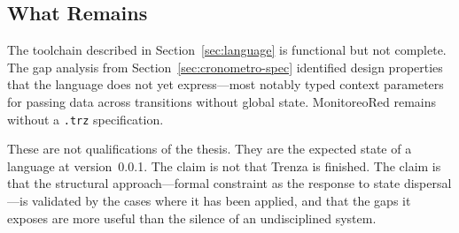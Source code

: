 \subsection{What Remains}
\label{sec:remains}

The toolchain described in Section~\ref{sec:language} is functional but not
complete. The gap analysis from Section~\ref{sec:cronometro-spec} identified
design properties that the language does not yet express---most notably typed
context parameters for passing data across transitions without global state.
MonitoreoRed remains without a \texttt{.trz} specification.

These are not qualifications of the thesis. They are the expected state of a
language at version~0.0.1. The claim is not that Trenza is finished. The claim
is that the structural approach---formal constraint as the response to state
dispersal---is validated by the cases where it has been applied, and that the
gaps it exposes are more useful than the silence of an undisciplined system.
